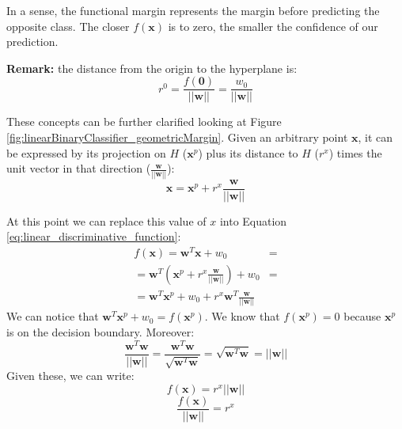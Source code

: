 
In a sense, the functional margin represents the margin before predicting the opposite
class. The closer $f(\pmb{x})$ is to zero, the smaller the confidence of our prediction.


\textbf{Remark:} the distance from the origin to the hyperplane is:
\begin{equation}
	r^{0}= \frac{f(\pmb{0})}{||\pmb{w}||}= \frac{w_{0}}{||\pmb{w}||}
\end{equation}

These concepts can be further clarified looking at Figure
\ref{fig:linearBinaryClassifier_geometricMargin}. Given an arbitrary point $\pmb{x}$,
it can be expressed by its projection on $H$ ($\pmb{x}^{p}$) plus its distance
to $H$ ($r^{x}$) times the unit vector in that direction ($\frac{\pmb{w}}{||\pmb{w}||}$):
\[
	\pmb{x}= \pmb{x}^{p}+ r^{x}\frac{\pmb{w}}{||\pmb{w}||}
\]

At this point we can replace this value of $x$ into Equation
\ref{eq:linear_discriminative_function}:
\begin{align*}
	f(\pmb{x}) = \pmb{w}^{T}\pmb{x}+ w_{0}                                      & = \\
	= \pmb{w}^{T}(\pmb{x}^{p}+ r^{x}\frac{\pmb{w}}{||\pmb{w}||}) + w_{0}        & = \\
	= \pmb{w}^{T}\pmb{x}^{p}+ w_{0}+ r^{x}\pmb{w}^{T}\frac{\pmb{w}}{||\pmb{w}||}
\end{align*}
We can notice that $\pmb{w}^{T}\pmb{x}^{p}+ w_{0}= f(\pmb{x}^{p})$. We know that
$f(\pmb{x}^{p}) = 0$ because $\pmb{x}^{p}$ is on the decision boundary. Moreover:
\[
	\frac{\pmb{w}^{T}\pmb{w}}{||\pmb{w}||}= \frac{\pmb{w}^{T}\pmb{w}}{\sqrt{\pmb{w}^{T}\pmb{w}}}
	= \sqrt{\pmb{w}^{T}\pmb{w}}= ||\pmb{w}||
\]
Given these, we can write:
\[
	f(\pmb{x}) = r^{x}||\pmb{w}||
\]
\[
	\frac{f(\pmb{x})}{||\pmb{w}||}= r^{x}
\]

